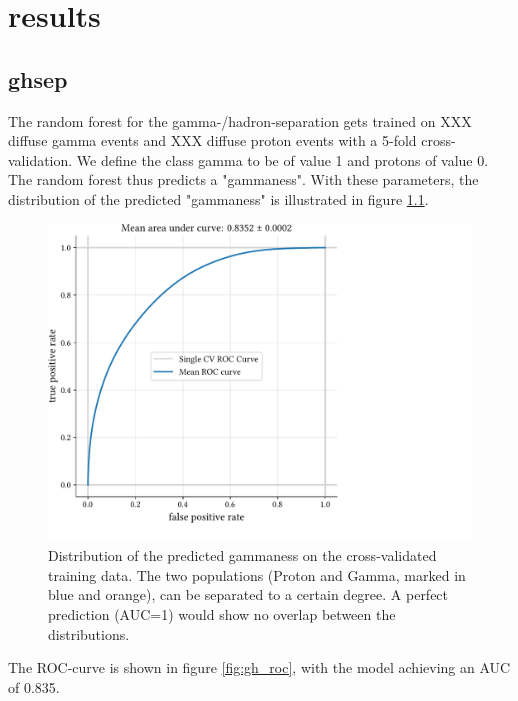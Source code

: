 \chapter{results}\label{results}


\section{ghsep}\label{ghsep}

The random forest for the gamma-/hadron-separation gets trained on 
XXX diffuse gamma events and XXX diffuse proton events with a 5-fold cross-validation.
We define the class gamma to be of value 1 and protons of value 0.
The random forest thus predicts a "gammaness".
With these parameters, the distribution of the predicted "gammaness" 
is illustrated in figure \ref{fig:gh_sep}.

\begin{figure}
    \centering
    \includegraphics[page=2, width=.8\textwidth]{../analysis/plots/cross_val_sep_perf_plot.pdf}
    \caption{Distribution of the predicted gammaness on the cross-validated training data.
	    The two populations (Proton and Gamma, marked in blue and orange), can be separated 
	    to a certain degree. 
    A perfect prediction (AUC=1) would show no overlap between the distributions.}
    \label{fig:gh_sep}
\end{figure}

The ROC-curve is shown in figure \ref{fig:gh_roc}, with the model achieving an AUC of 
\num{0.835}.



